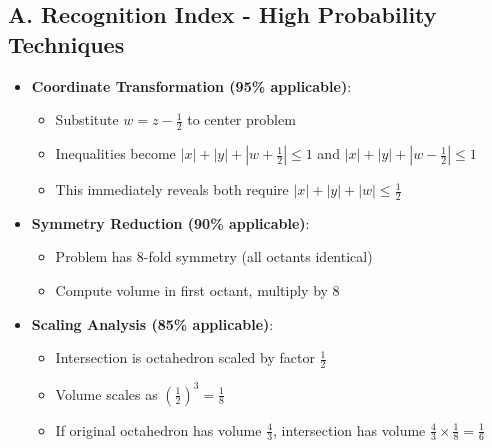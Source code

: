 \documentclass[11pt]{article}
\begin{document}
\begin{conversionbox}
\subsection*{A. Recognition Index - High Probability Techniques}
\begin{itemize}[leftmargin=*]
    \item \textbf{Coordinate Transformation (95\% applicable)}: 
    \begin{itemize}
        \item Substitute $w = z - \frac{1}{2}$ to center problem
        \item Inequalities become $|x|+|y|+|w+\frac{1}{2}|\le1$ and $|x|+|y|+|w-\frac{1}{2}|\le1$
        \item This immediately reveals both require $|x|+|y|+|w|\le\frac{1}{2}$
    \end{itemize}
    \item \textbf{Symmetry Reduction (90\% applicable)}:
    \begin{itemize}
        \item Problem has 8-fold symmetry (all octants identical)
        \item Compute volume in first octant, multiply by 8
    \end{itemize}
    \item \textbf{Scaling Analysis (85\% applicable)}:
    \begin{itemize}
        \item Intersection is octahedron scaled by factor $\frac{1}{2}$
        \item Volume scales as $(\frac{1}{2})^3 = \frac{1}{8}$
        \item If original octahedron has volume $\frac{4}{3}$, intersection has volume $\frac{4}{3} \times \frac{1}{8} = \frac{1}{6}$
    \end{itemize}
\end{itemize}


\end{conversionbox}
\end{document}
